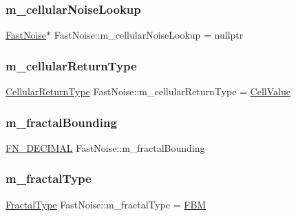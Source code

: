 \subsubsection{\texorpdfstring{m\+\_\+cellular\+Noise\+Lookup}{m\_cellularNoiseLookup}}
{\footnotesize\ttfamily \mbox{\hyperlink{class_fast_noise}{Fast\+Noise}}$\ast$ Fast\+Noise\+::m\+\_\+cellular\+Noise\+Lookup = nullptr\hspace{0.3cm}{\ttfamily [private]}}

\mbox{\label{class_fast_noise_a9946be56a23e07f59b61fb7723ec638c}} 
\subsubsection{\texorpdfstring{m\+\_\+cellular\+Return\+Type}{m\_cellularReturnType}}
{\footnotesize\ttfamily \mbox{\hyperlink{class_fast_noise_a942d73b97b870138c9a07249d5a57737}{Cellular\+Return\+Type}} Fast\+Noise\+::m\+\_\+cellular\+Return\+Type = \mbox{\hyperlink{class_fast_noise_a942d73b97b870138c9a07249d5a57737a72381c72f202dd945fadc7e77da08dab}{Cell\+Value}}\hspace{0.3cm}{\ttfamily [private]}}

\mbox{\label{class_fast_noise_a64c5725bb6bf6f7a754176c3482ec782}} 
\subsubsection{\texorpdfstring{m\+\_\+fractal\+Bounding}{m\_fractalBounding}}
{\footnotesize\ttfamily \mbox{\hyperlink{_fast_noise_8h_a75a9ef6d2541c4921815b885bfd449c3}{F\+N\+\_\+\+D\+E\+C\+I\+M\+AL}} Fast\+Noise\+::m\+\_\+fractal\+Bounding\hspace{0.3cm}{\ttfamily [private]}}

\mbox{\label{class_fast_noise_a88ff6e7299480446e075e9558fa47360}} 
\subsubsection{\texorpdfstring{m\+\_\+fractal\+Type}{m\_fractalType}}
{\footnotesize\ttfamily \mbox{\hyperlink{class_fast_noise_a20a2d45a468fa10a7c6a94e22c2f3d30}{Fractal\+Type}} Fast\+Noise\+::m\+\_\+fractal\+Type = \mbox{\hyperlink{class_fast_noise_a20a2d45a468fa10a7c6a94e22c2f3d30a75ebe681cdebfda37508de40c47484db}{F\+BM}}\hspace{0.3cm}{\ttfamily [private]}}

